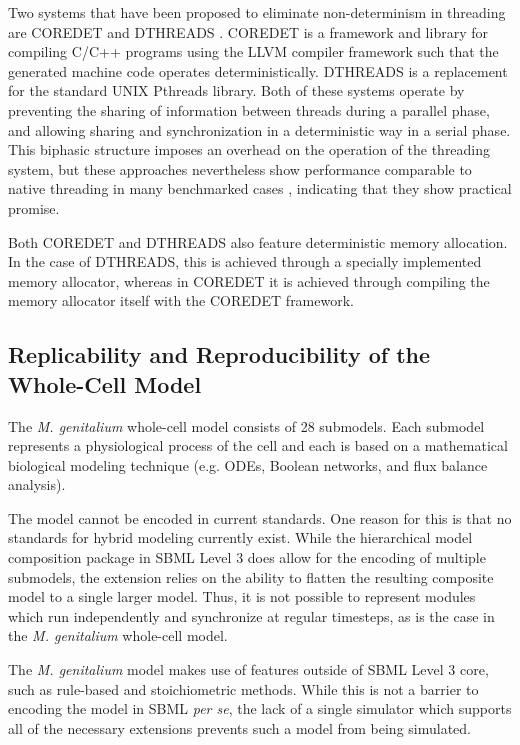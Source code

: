 \documentclass[journal,transmag,twoside]{IEEEtran}
\begin{document}
Two systems that have been proposed to eliminate non-determinism in threading
are C{\small ORE}D{\small ET} \cite{bergan2010coredet} and D{\small THREADS} \cite{liu2011dthreads}.
C{\small ORE}D{\small ET} is a framework and library for compiling C/C++ programs
using the LLVM compiler framework such that the generated machine code operates deterministically.
D{\small THREADS} is a replacement for the standard UNIX Pthreads library.
Both of these systems operate by preventing the sharing of information between
threads during a parallel phase, and allowing sharing and synchronization
in a deterministic way in a serial phase.
This biphasic structure imposes an overhead on the operation of the threading
system, but these approaches nevertheless show performance comparable to native
threading in many benchmarked cases \cite{liu2011dthreads}, indicating that they show
practical promise.

Both C{\small ORE}D{\small ET} and D{\small THREADS} also
feature deterministic memory allocation. In the case of D{\small THREADS},
this is achieved through a specially implemented memory allocator,
whereas in C{\small ORE}D{\small ET} it is achieved through compiling the
memory allocator itself with the C{\small ORE}D{\small ET} framework.

\subsection{Replicability and Reproducibility of the Whole-Cell Model}

The \textit{M. genitalium} whole-cell model \cite{Karr2012} consists of
28 submodels.
Each submodel represents a physiological process of the cell
and each is based on a mathematical biological modeling technique
(e.g. ODEs, Boolean networks, and flux balance analysis).

The model cannot be encoded in current standards.
One reason for this is that no standards for hybrid modeling currently exist.
While the hierarchical model composition package in SBML Level 3 does allow
for the encoding of multiple submodels, the extension relies on the ability
to flatten the resulting composite model to a single larger model.
Thus, it is not possible to represent modules which run independently
and synchronize at regular timesteps, as is the case in the \textit{M. genitalium} whole-cell model.

The \textit{M. genitalium} model makes use of features outside of SBML Level 3 core,
such as rule-based and stoichiometric methods.
While this is not a barrier to encoding the model in SBML \textit{per se}, the lack
of a single simulator which supports all of the necessary extensions
prevents such a model from being simulated.
\end{document}
